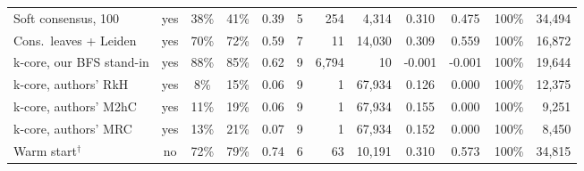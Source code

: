 \begin{tabular}{l c c c c c r r c c c r}
Soft consensus{,} 100 & yes & 38\% & 41\% & 0.39 & 5 & 254 & 4{,}314 & 0.310 & 0.475 & 100\% & 34{,}494 \\
Cons.\ leaves + Leiden & yes & 70\% & 72\% & 0.59 & 7 & 11 & 14{,}030 & 0.309 & 0.559 & 100\% & 16{,}872 \\
k-core{,} our BFS stand-in & yes & 88\% & 85\% & 0.62 & 9 & 6{,}794 & 10 & -0.001 & -0.001 & 100\% & 19{,}644 \\
k-core{,} authors' RkH & yes & 8\% & 15\% & 0.06 & 9 & 1 & 67{,}934 & 0.126 & 0.000 & 100\% & 12{,}375 \\
k-core{,} authors' M2hC & yes & 11\% & 19\% & 0.06 & 9 & 1 & 67{,}934 & 0.155 & 0.000 & 100\% & 9{,}251 \\
k-core{,} authors' MRC & yes & 13\% & 21\% & 0.07 & 9 & 1 & 67{,}934 & 0.152 & 0.000 & 100\% & 8{,}450 \\
Warm start$^{\dagger}$ & no & 72\% & 79\% & 0.74 & 6 & 63 & 10{,}191 & 0.310 & 0.573 & 100\% & 34{,}815 \\
\bottomrule
\end{tabular}
